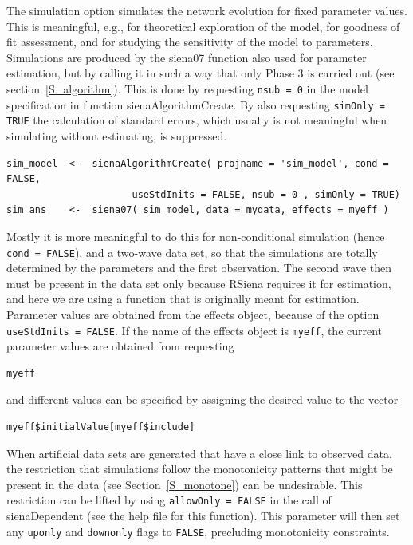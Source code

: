 \documentclass[a4paper,fleqn,11pt]{article}
\newcommand{\+}{\, + \,}
\newcommand{\sfn}[1]{\textsf{#1}}
\newcommand{\RS}{{\sf RSiena }}
\newcommand{\SI}{{\sf SIENA }}
\begin{document}
The simulation option simulates the network evolution for fixed
parameter values. This is meaningful, e.g., for theoretical
exploration of the model, for goodness of fit assessment,
and for studying the sensitivity of the model to parameters.
Simulations are produced by the \textsf{siena07} function
also used for parameter estimation, but by calling it in
such a way that only Phase 3 is carried out
(see section~\ref{S_algorithm}).
This is done by requesting \texttt{nsub = 0} in
the model specification in function \textsf{sienaAlgorithmCreate}.
By also requesting \texttt{simOnly = TRUE} the calculation
of standard errors, which usually is not meaningful when
simulating without estimating, is suppressed.
\begin{verbatim}
sim_model  <-  sienaAlgorithmCreate( projname = 'sim_model', cond = FALSE,
                      useStdInits = FALSE, nsub = 0 , simOnly = TRUE)
sim_ans    <-  siena07( sim_model, data = mydata, effects = myeff )
\end{verbatim}
Mostly it is more meaningful to do this for non-conditional simulation
(hence \texttt{cond = FALSE}), and a two-wave data set,
so that the simulations are totally determined
by the parameters and the first observation.
The second wave then must be present in the data set only
because \RS requires it for estimation,
and here we are using a function that is originally
meant for estimation.
Parameter values are obtained from the effects object,
because of the option \texttt{useStdInits = FALSE}.
If the name of the effects object is \texttt{myeff},
the current parameter values are obtained from requesting
\begin{verbatim}
myeff
\end{verbatim}
and different values can be specified by assigning the
desired value to the vector
\begin{verbatim}
myeff$initialValue[myeff$include]
\end{verbatim}

When artificial data sets are generated that have a close link to observed data,
the restriction that simulations follow the monotonicity patterns that
might be present in the data (see Section~\ref{S_monotone}) can be undesirable.
This restriction can be lifted by using \texttt{allowOnly = FALSE}
in the call of \sfn{sienaDependent} (see the help file for this function).
This parameter will then set any \texttt{uponly} and \texttt{downonly}
flags to \texttt{FALSE}, precluding monotonicity constraints.

\end{document}
